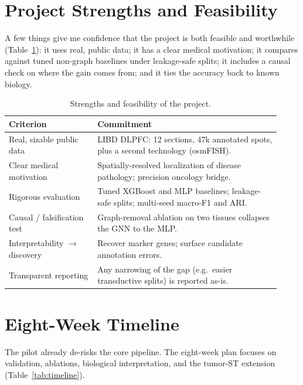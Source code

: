 \documentclass[11pt]{article}
\begin{document}
\section{Project Strengths and Feasibility}

A few things give me confidence that the project is both feasible and worthwhile
(Table~\ref{tab:formula}): it uses real, public data; it has a clear medical
motivation; it compares against tuned non-graph baselines under leakage-safe
splits; it includes a causal check on where the gain comes from; and it ties the
accuracy back to known biology.

\begin{table}[H]
\centering\small
\begin{tabular}{>{\raggedright\arraybackslash}p{0.30\linewidth} >{\raggedright\arraybackslash}p{0.62\linewidth}}
\toprule
\rowcolor{sriblue}\color{white}\textbf{Criterion} & \color{white}\textbf{Commitment}\\
\midrule
\rowcolor{srirow} Real, sizable public data & LIBD DLPFC: 12 sections, 47k annotated spots, plus a second technology (osmFISH).\\
Clear medical motivation & Spatially-resolved localization of disease pathology; precision oncology bridge.\\
\rowcolor{srirow} Rigorous evaluation & Tuned XGBoost and MLP baselines; leakage-safe splits; multi-seed macro-F1 and ARI.\\
Causal / falsification test & Graph-removal ablation on two tissues collapses the GNN to the MLP.\\
\rowcolor{srirow} Interpretability $\rightarrow$ discovery & Recover marker genes; surface candidate annotation errors.\\
Transparent reporting & Any narrowing of the gap (e.g.\ easier transductive splits) is reported as-is.\\
\bottomrule
\end{tabular}
\caption{Strengths and feasibility of the project.}
\label{tab:formula}
\end{table}

\section{Eight-Week Timeline}

The pilot already de-risks the core pipeline. The eight-week plan focuses on
validation, ablations, biological interpretation, and the tumor-ST extension
(Table~\ref{tab:timeline}).
\end{document}

